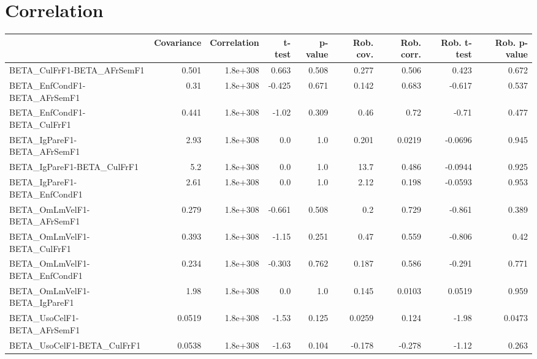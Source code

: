 \section{Correlation}
\begin{tabular}{lrrrrrrrr}
\toprule
{} &  Covariance &  Correlation &  t-test &  p-value &  Rob. cov. &  Rob. corr. &  Rob. t-test &  Rob. p-value \\
\midrule
BETA\_CulFrF1-BETA\_AFrSemF1            &       0.501 &     1.8e+308 &   0.663 &    0.508 &      0.277 &       0.506 &        0.423 &         0.672 \\
BETA\_EnfCondF1-BETA\_AFrSemF1          &        0.31 &     1.8e+308 &  -0.425 &    0.671 &      0.142 &       0.683 &       -0.617 &         0.537 \\
BETA\_EnfCondF1-BETA\_CulFrF1           &       0.441 &     1.8e+308 &   -1.02 &    0.309 &       0.46 &        0.72 &        -0.71 &         0.477 \\
BETA\_IgPareF1-BETA\_AFrSemF1           &        2.93 &     1.8e+308 &     0.0 &      1.0 &      0.201 &      0.0219 &      -0.0696 &         0.945 \\
BETA\_IgPareF1-BETA\_CulFrF1            &         5.2 &     1.8e+308 &     0.0 &      1.0 &       13.7 &       0.486 &      -0.0944 &         0.925 \\
BETA\_IgPareF1-BETA\_EnfCondF1          &        2.61 &     1.8e+308 &     0.0 &      1.0 &       2.12 &       0.198 &      -0.0593 &         0.953 \\
BETA\_OmLmVelF1-BETA\_AFrSemF1          &       0.279 &     1.8e+308 &  -0.661 &    0.508 &        0.2 &       0.729 &       -0.861 &         0.389 \\
BETA\_OmLmVelF1-BETA\_CulFrF1           &       0.393 &     1.8e+308 &   -1.15 &    0.251 &       0.47 &       0.559 &       -0.806 &          0.42 \\
BETA\_OmLmVelF1-BETA\_EnfCondF1         &       0.234 &     1.8e+308 &  -0.303 &    0.762 &      0.187 &       0.586 &       -0.291 &         0.771 \\
BETA\_OmLmVelF1-BETA\_IgPareF1          &        1.98 &     1.8e+308 &     0.0 &      1.0 &      0.145 &      0.0103 &       0.0519 &         0.959 \\
BETA\_UsoCelF1-BETA\_AFrSemF1           &      0.0519 &     1.8e+308 &   -1.53 &    0.125 &     0.0259 &       0.124 &        -1.98 &        0.0473 \\
BETA\_UsoCelF1-BETA\_CulFrF1            &      0.0538 &     1.8e+308 &   -1.63 &    0.104 &     -0.178 &      -0.278 &        -1.12 &         0.263 \\

\end{tabular}
